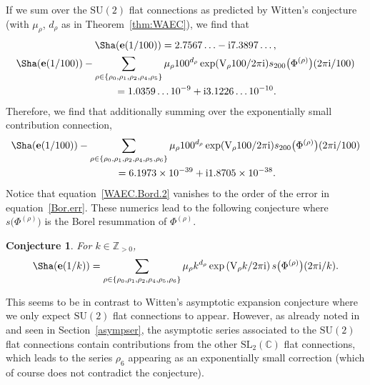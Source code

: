 \documentclass[pdftex]{sigma}
\numberwithin{equation}{section}
\newtheorem{Conjecture}[Theorem]{Conjecture}
\def\BZ{\mathbb{Z}}
\def\BC{\mathbb{C}}
\def\SL{\mathrm{SL}}
\def\e{\mathbf e}
\def\VC{\mathrm{VC}}
\def\SL{\mathrm{SL}}
\def\SU{\mathrm{SU}}
\def\WRT{\Sha}
\def\BZ{\mathbb Z}
\def\BC{\mathbb C}
\def\SL{\mathrm{SL}}
\def\VC{\mathrm{V}}
\def\SU{\mathrm{SU}}
\begin{document}
If we sum over the $\SU(2)$ flat connections as predicted by Witten's conjecture (with $\mu_\rho$, $d_\rho$ as in Theorem~\ref{thm:WAEC}), we find that
\begin{gather*}%
 \WRT(\e(1/100))
  = 2.7567\ldots - {\rm i}7.3897\dots,\\
 \WRT(\e(1/100))
 -
 \sum_{\rho\in\{\rho_0,\rho_1,\rho_2,\rho_4,\rho_5\}}  \mu_{\rho}100^{d_\rho}\exp(\VC_{\rho}100/2\pi {\rm i})s_{200}\bigl(\Phi^{(\rho)}\bigr)(2\pi {\rm i}/100)\\
 \qquad{} =
 1.0359\dots 10^{-9} + {\rm i}3.1226\dots 10^{-10} .
\end{gather*}
Therefore, we find that additionally summing over the exponentially small contribution connection,
\begin{gather}
 \WRT(\e(1/100))
 -
 \sum_{\rho\in\{\rho_0,\rho_1,\rho_2,\rho_4,\rho_5,\rho_6\}}\mu_{\rho}100^{d_\rho}\exp(\VC_{\rho}100/2\pi {\rm i})s_{200}\bigl(\Phi^{(\rho)}\bigr)(2\pi {\rm i}/100)\nonumber\\
 \qquad{} =
 6.1973\times10^{-39} + {\rm i}1.8705\times10^{-38} .\label{WAEC.Bord.2}
\end{gather}
Notice that equation~\eqref{WAEC.Bord.2} vanishes to the order of the error in equation~\eqref{Bor.err}. These numerics lead to the following conjecture where $s\bigl(\Phi^{(\rho)}\bigr)$ is the Borel resummation of $\Phi^{(\rho)}$.
\begin{Conjecture}
For $k\in\BZ_{>0}$,
\[
 \WRT(\e(1/k))
  =
 \sum_{\rho\in\{\rho_0,\rho_1,\rho_2,\rho_4,\rho_5,\rho_6\}}\mu_{\rho}k^{d_\rho}\exp\left(\VC_{\rho}k/2\pi {\rm i}\right)s\bigl(\Phi^{(\rho)}\bigr)(2\pi {\rm i}/k) .
\]
\end{Conjecture}
This seems to be in contrast to Witten's asymptotic expansion conjecture where we only expect $\mathrm{SU}(2)$ flat connections to appear. However, as already noted in~\cite{Gar:resCS} and seen in Section~\ref{asympser}, the asymptotic series associated to the $\mathrm{SU}(2)$ flat connections contain contributions from the other $\SL_{2}(\BC)$ flat connections, which leads to the series $\rho_6$ appearing as an exponentially small correction (which of course does not contradict the conjecture).
\end{document}
